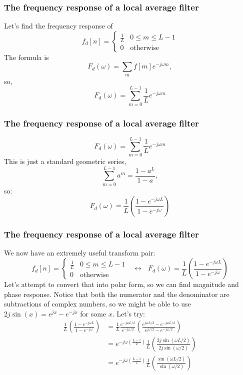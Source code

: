 \documentclass{beamer}
\begin{document}
\begin{frame}
  \frametitle{The frequency response of a local average filter}

  Let's find the frequency response of
  \[
  f_d[n] = \begin{cases} \frac{1}{L}& 0\le m\le L-1\\
    0&\mbox{otherwise}\end{cases}
  \]
  The formula is
  \[
  F_d(\omega) = \sum_m f[m]e^{-j\omega m},
  \]
  so,
  \[
  F_d(\omega) = \sum_{m=0}^{L-1} \frac{1}{L}e^{-j\omega m}
  \]
\end{frame}
  
\begin{frame}
  \frametitle{The frequency response of a local average filter}

  \[
  F_d(\omega) = \sum_{m=0}^{L-1} \frac{1}{L}e^{-j\omega m}
  \]
  This is just a standard geometric series,
  \[
  \sum_{m=0}^{L-1} a^m = \frac{1-a^L}{1-a},
  \]
  so:
  \[
  F_d(\omega) = \frac{1}{L}\left(\frac{1-e^{-j\omega L}}{1-e^{-j\omega}}\right)
  \]
\end{frame}

\begin{frame}
  \frametitle{The frequency response of a local average filter}

  We now have an extremely  useful transform pair:
  \[
  f_d[n] = \begin{cases} \frac{1}{L}& 0\le m\le L-1\\
    0&\mbox{otherwise}\end{cases}~~~\leftrightarrow~~~
  F_d(\omega) = \frac{1}{L}\left(\frac{1-e^{-j\omega L}}{1-e^{-j\omega}}\right)
  \]
  Let's attempt to convert that into polar form, so we can find
  magnitude and phase response. Notice that both the numerator and the
  denominator are subtractions of complex numbers, so we might be able
  to use $2j\sin(x)=e^{jx}-e^{-jx}$ for some $x$.  Let's try:
  \begin{align*}
    \frac{1}{L}\left(\frac{1-e^{-j\omega L}}{1-e^{-j\omega}}\right)
    &= \frac{1}{L}\frac{e^{-j\omega L/2}}{e^{-j\omega/2}}
    \left(\frac{e^{j\omega L/2}-e^{-j\omega L/2}}{e^{j\omega/2}-e^{-j\omega/2}}\right)\\
    &= e^{-j\omega\left(\frac{L-1}{2}\right)}\frac{1}{L}
    \left(\frac{2j\sin(\omega L/2)}{2j\sin(\omega/2)}\right)\\
    &= e^{-j\omega\left(\frac{L-1}{2}\right)}\frac{1}{L}
    \left(\frac{\sin(\omega L/2)}{\sin(\omega/2)}\right)
  \end{align*}
\end{frame}
  
\end{document}
